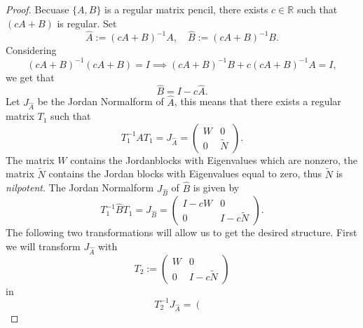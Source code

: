 \documentclass[11pt,titlepage]{article}
\begin{document}
				\begin{proof}
					Becuase $\{A,B\}$ is a regular matrix pencil, there exists $c \in \mathbb{R}$ such that $(cA+B)$ is regular. Set
					\begin{displaymath}
						\hat{A} := (cA+B)^{-1}A, \quad \hat{B} := (cA+B)^{-1}B.
					\end{displaymath}
					Considering 
					\begin{displaymath}
						(cA+B)^{-1}(cA+B) = I \implies (cA+B)^{-1}B+c(cA+B)^{-1}A = I ,
					\end{displaymath}
					we get that
					\begin{displaymath}
						\hat{B} = I-c \hat{A} .
					\end{displaymath}
					Let $J_ {\hat{A}}$ be the Jordan Normalform of $\hat{A}$, this means that there exists a regular matrix $T_1$ such that
					\begin{displaymath}
						T_1^{-1}AT_1 = J_{\hat{A}} =
						\left(
						\begin{matrix}
							W & 0 \\
							0 & \tilde{N} 
						\end{matrix}
						\right) .
					\end{displaymath}
					The matrix $W$ contains the Jordanblocks with Eigenvalues which are nonzero, the matrix $\tilde{N}$ contains the Jordan blocks with Eigenvalues equal to zero, thus $\tilde{N}$ is \emph{nilpotent}.
					The Jordan Normalform $J_{\hat{B}}$ of $\hat{B}$ is given by
					\begin{displaymath}
						T_1^{-1} \hat{B} T_1 = J_{\hat{B}} = 
						\left(
						\begin{matrix}
							I-cW & 0 \\
							0 & I-c\tilde{N}
						\end{matrix}
						\right) .
					\end{displaymath}
					The following two transformations will allow us to get the desired structure.
					First we will transform $J_{\hat{A}}$ with
					\begin{displaymath}
						T_2 :=
						\left(
						\begin{matrix}
							W & 0 \\
							0 & I-c\tilde{N}
						\end{matrix}
						\right)
					\end{displaymath}
					in
					\begin{displaymath}
						T_2^{-1}J_{\hat{A}} = 
						\left(
						\begin{matrix}

\end{matrix}
\end{displaymath}
\end{proof}
\end{document}
